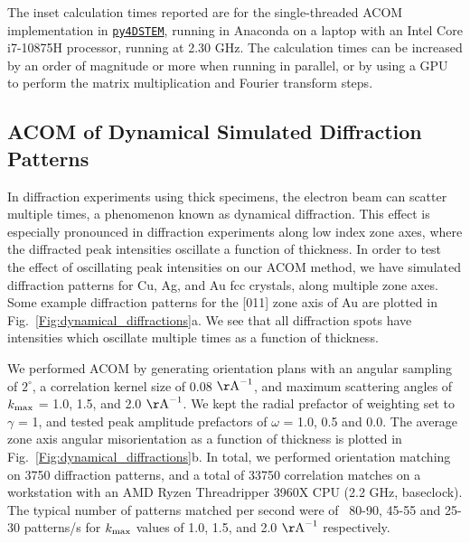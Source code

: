 \documentclass[%
 superscriptaddress,
 aip,
 amsmath,amssymb,
reprint,%
 author-year,%
longbibliography
]{revtex4-2}
\newcommand{\pyFDSTEM}{\href{https://github.com/py4dstem/py4DSTEM}{\texttt{py4DSTEM}}}
\begin{document}
The inset calculation times reported are for the single-threaded ACOM implementation in \pyFDSTEM, running in Anaconda \citep{anaconda} on a laptop with an Intel Core i7-10875H processor, running at 2.30 GHz. The calculation times can be increased by an order of magnitude or more when running in parallel, or by using a GPU to perform the matrix multiplication and Fourier transform steps.









\subsection*{ACOM of Dynamical Simulated Diffraction Patterns}


In diffraction experiments using thick specimens, the electron beam can scatter multiple times, a phenomenon known as dynamical diffraction. This effect is especially pronounced in diffraction experiments along low index zone axes, where the diffracted peak intensities oscillate a function of thickness. In order to test the effect of oscillating peak intensities on our ACOM method, we have simulated diffraction patterns for Cu, Ag, and Au fcc crystals, along multiple zone axes. Some example diffraction patterns for the [011] zone axis of Au are plotted in Fig.~\ref{Fig:dynamical_diffractions}a. We see that all diffraction spots have intensities which oscillate multiple times as a function of thickness. 

We performed ACOM by generating orientation plans with an angular sampling of $2^\circ$, a correlation kernel size of 0.08 $\rm{\AA}^{-1}$, and maximum scattering angles of $k_{\rm{max}}$ = 1.0, 1.5, and 2.0 $\rm{\AA}^{-1}$. We kept the radial prefactor of weighting set to $\gamma $ = 1, and tested peak amplitude prefactors of $\omega$ = 1.0, 0.5 and 0.0. The average zone axis angular misorientation as a function of thickness is plotted in Fig.~\ref{Fig:dynamical_diffractions}b. In total, we performed orientation matching on 3750 diffraction patterns, and a total of 33750 correlation matches on a  workstation with an AMD Ryzen Threadripper 3960X CPU (2.2 GHz, baseclock). The typical number of patterns matched per second were of ~80-90, 45-55 and 25-30 patterns/s for $k_{\rm{max}}$ values of 1.0, 1.5, and 2.0 $\rm{\AA}^{-1}$ respectively. 
\end{document}
